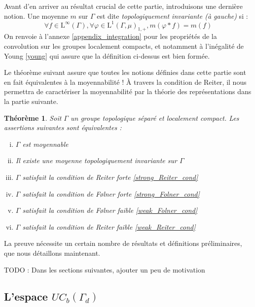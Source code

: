 \documentclass[a4paper,12pt]{article}
\newtheorem{theorem}{Théorème}[section]
\newcommand{\TODO}[1]{{\color{red}TODO :} #1}
\begin{document}
Avant d'en arriver au résultat crucial de cette partie, introduisons une dernière notion. Une moyenne $m$ sur $\Gamma$ est dite 
\emph{topologiquement invariante (à gauche)} si :
\begin{equation*}
    \forall f\in\mathrm{L}^\infty(\Gamma), \forall\varphi\in\mathrm{L}^1(\Gamma, \mu)_{1, +}, m(\varphi*f) = m(f)
\end{equation*}
On renvoie à l'annexe \ref{appendix_integration} pour les propriétés de la convolution sur les groupes localement
compacts, et notamment à l'inégalité de Young \ref{young} qui assure que la définition ci-dessus est bien formée.

Le théorème suivant assure que toutes les notions définies dans cette partie sont en fait équivalentes à la moyennabilité ! À travers la condition de Reiter, il nous 
permettra de caractériser la moyennabilité par la théorie des représentations dans la partie suivante.

\begin{theorem}\label{amenable_TFAE}
    Soit $\Gamma$ un groupe topologique séparé et localement compact. Les assertions suivantes sont équivalentes :
    \begin{enumerate}[(i)]
        \item $\Gamma$ est moyennable \label{amenable_TFAE/amenable}
        \item Il existe une moyenne topologiquement invariante sur $\Gamma$ \label{amenable_TFAE/topological_mean}
        \item $\Gamma$ satisfait la condition de Reiter forte \label{amenable_TFAE/strong_Reiter} \eqref{strong_Reiter_cond}
        \item $\Gamma$ satisfait la condition de F\o{}lner forte \label{amenable_TFAE/strong_Folner} \eqref{strong_Folner_cond}
        \item $\Gamma$ satisfait la condition de F\o{}lner faible \label{amenable_TFAE/weak_Folner} \eqref{weak_Folner_cond}
        \item $\Gamma$ satisfait la condition de Reiter faible \label{amenable_TFAE/weak_Reiter} \eqref{weak_Reiter_cond}
    \end{enumerate}
\end{theorem}

La preuve nécessite un certain nombre de résultats et définitions préliminaires, que nous détaillons maintenant. 

\TODO{Dans les sections suivantes, ajouter un peu de motivation}

\subsection{L'espace \texorpdfstring{$UC_b(\Gamma_d)$}{des fonctions uniformément continues bornées}}
\end{document}

